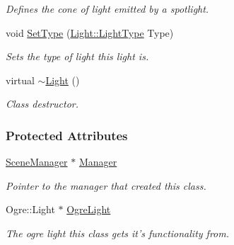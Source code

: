 \begin{DoxyCompactItemize}
\begin{DoxyCompactList}\small\item\em Defines the cone of light emitted by a spotlight. \item\end{DoxyCompactList}\item 
void \hyperlink{classMezzanine_1_1Light_a3eb8a8a9919dee3ae8e403d6f1946f45}{SetType} (\hyperlink{classMezzanine_1_1Light_a783df27d8261c5af2226bc75586944be}{Light::LightType} Type)
\begin{DoxyCompactList}\small\item\em Sets the type of light this light is. \item\end{DoxyCompactList}\item 
\hypertarget{classMezzanine_1_1Light_aa86b020d33393ff4e14d3ff40fc9b506}{
virtual \hyperlink{classMezzanine_1_1Light_aa86b020d33393ff4e14d3ff40fc9b506}{$\sim$Light} ()}
\label{classMezzanine_1_1Light_aa86b020d33393ff4e14d3ff40fc9b506}

\begin{DoxyCompactList}\small\item\em Class destructor. \item\end{DoxyCompactList}\end{DoxyCompactItemize}
\subsubsection*{Protected Attributes}
\begin{DoxyCompactItemize}
\item 
\hypertarget{classMezzanine_1_1Light_a33af923976c32b2a34aaae8549ed35e4}{
\hyperlink{classMezzanine_1_1SceneManager}{SceneManager} $\ast$ \hyperlink{classMezzanine_1_1Light_a33af923976c32b2a34aaae8549ed35e4}{Manager}}
\label{classMezzanine_1_1Light_a33af923976c32b2a34aaae8549ed35e4}

\begin{DoxyCompactList}\small\item\em Pointer to the manager that created this class. \item\end{DoxyCompactList}\item 
\hypertarget{classMezzanine_1_1Light_a228f1f22dbee36bed47894086d2191ff}{
Ogre::Light $\ast$ \hyperlink{classMezzanine_1_1Light_a228f1f22dbee36bed47894086d2191ff}{OgreLight}}
\label{classMezzanine_1_1Light_a228f1f22dbee36bed47894086d2191ff}

\begin{DoxyCompactList}\small\item\em The ogre light this class gets it's functionality from. \item\end{DoxyCompactList}\end{DoxyCompactItemize}


